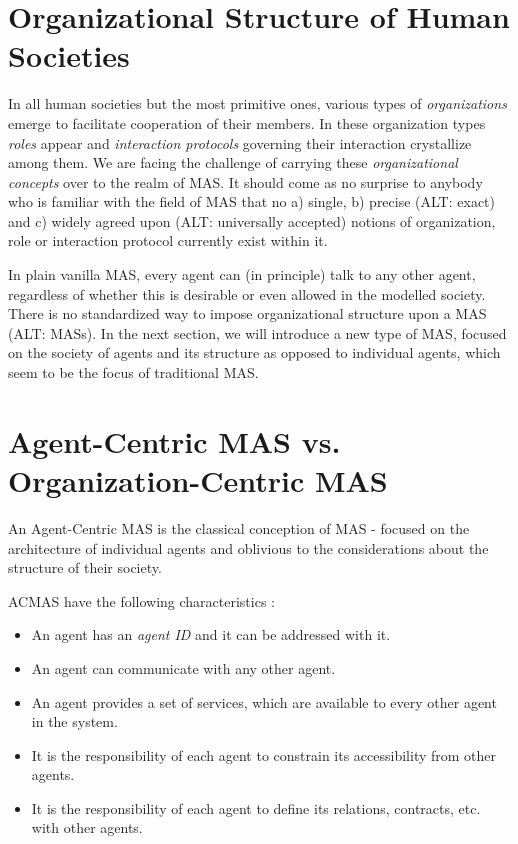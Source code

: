 \section{Organizational Structure of Human Societies}

In all human societies but the most primitive ones, various types of \textit{organizations} emerge to facilitate cooperation of their members.
In these organization types \textit{roles} appear and \textit{interaction protocols} governing their interaction crystallize among them.
We are facing the challenge of carrying these \textit{organizational concepts} over to the realm of MAS.
It should come as no surprise to anybody who is familiar with the field of MAS that no a) single, b) precise (ALT: exact) and c) widely agreed upon (ALT: universally accepted) notions of organization, role or interaction protocol currently exist within it.

In plain vanilla MAS, every agent can (in principle) talk to any other agent, regardless of whether this is desirable or even allowed in the modelled society.
There is no standardized way to impose organizational structure upon a MAS (ALT: MASs). 
In the next section, we will introduce a new type of MAS, focused on the society of agents and its structure as opposed to individual agents, which seem to be the focus of traditional MAS.

\section{Agent-Centric MAS vs. Organization-Centric MAS}

An Agent-Centric MAS is the classical conception of MAS - focused on the architecture of individual agents and oblivious to the considerations about the structure of their society.

ACMAS have the following characteristics \cite{Ferber03}:
\begin{itemize}
	\item An agent has an \textit{agent ID} and it can be addressed with it.
	\item An agent can communicate with any other agent.
	\item An agent provides a set of services, which are available to every other agent in the system.
	\item It is the responsibility of each agent to constrain its accessibility from other agents.
	\item It is the responsibility of each agent to define its relations, contracts, etc. with other agents.
\end{itemize}

